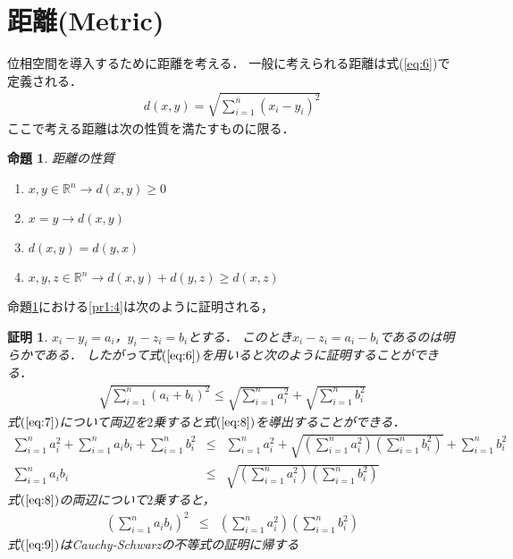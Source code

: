 \documentclass[11pt,a4j]{jarticle}
\newtheorem{prop}{命題}
\newtheorem{Proof}{証明}
\begin{document}
\section{距離(Metric)}
位相空間を導入するために距離を考える．
一般に考えられる距離は式(\ref{eq:6})で定義される．
\begin{eqnarray}
    \label{eq:6}
    d(x,y)=\sqrt{\sum_{i=1}^n (x_i - y_i)^2}
\end{eqnarray}
ここで考える距離は次の性質を満たすものに限る．
\begin{prop}
    \label{pr:1}距離の性質
    \begin{enumerate}
        \renewcommand{\labelenumi}{(\roman{enumi})}
        \item ${x,y \in \mathbb{R}^n} \rightarrow d(x,y) \geq 0$\label{pr1:1}
        \item $x=y \rightarrow d(x,y)$\label{pr1:2}
        \item $d(x,y)=d(y,x)$\label{pr1:3}
        \item ${x,y,z \in \mathbb{R}^n} \rightarrow d(x,y) + d(y,z) \geq d(x,z)$\label{pr1:4}
    \end{enumerate}
\end{prop}
命題\ref{pr:1}における\ref{pr1:4}は次のように証明される，
\begin{Proof}
    $x_i-y_i=a_i$，$y_i-z_i=b_i$とする．
    このとき$x_i-z_i=a_i-b_i$であるのは明らかである．
    したがって式$(\ref{eq:6})$を用いると次のように証明することができる．
    \begin{eqnarray}
        \label{eq:7}
        \sqrt{\sum_{i=1}^n (a_i+b_i)^2}\leq \sqrt{\sum_{i=1}^n a_i^2} + \sqrt{\sum_{i=1}^n b_i^2}
    \end{eqnarray}
    式$(\ref{eq:7})$について両辺を$2$乗すると式$(\ref{eq:8})$を導出することができる．
    \begin{eqnarray}
        \sum_{i=1}^n a_i^2 + \sum_{i=1}^n a_i b_i + \sum_{i=1}^n b_i^2 & \leq & \sum_{i=1}^n a_i^2 + \sqrt{(\sum_{i=1}^n a_i^2)(\sum_{i=1}^n b_i^2)} + \sum_{i=1}^n b_i^2 \nonumber \\
        \sum_{i=1}^n a_i b_i & \leq & \sqrt{(\sum_{i=1}^n a_i^2)(\sum_{i=1}^n b_i^2)}
        \label{eq:8}
    \end{eqnarray}
    式$(\ref{eq:8})$の両辺について$2$乗すると，
    \begin{eqnarray}
        \label{eq:9}
        (\sum_{i=1}^n a_i b_i)^2 & \leq & (\sum_{i=1}^n a_i^2)(\sum_{i=1}^n b_i^2)
    \end{eqnarray}
    式$(\ref{eq:9})$はCauchy-Schwarzの不等式の証明に帰する
\end{Proof}
\end{document}
